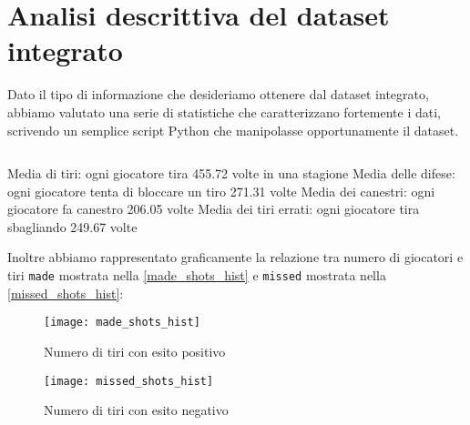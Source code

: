 \section{Analisi descrittiva del dataset integrato}

Dato il tipo di informazione che desideriamo ottenere dal dataset integrato, abbiamo valutato una serie di statistiche che caratterizzano fortemente i dati, scrivendo un semplice script Python che manipolasse opportunamente il dataset.

\begin{code}
\inputminted[breaklines]{python}{../dataintegration/count.py}
\end{code}

Media di tiri: ogni giocatore tira 455.72 volte in una stagione
Media delle difese: ogni giocatore tenta di bloccare un tiro 271.31 volte
Media dei canestri: ogni giocatore fa canestro 206.05 volte
Media dei tiri errati: ogni giocatore tira sbagliando 249.67 volte

Inoltre abbiamo rappresentato graficamente la relazione tra numero di giocatori e tiri \texttt{made} mostrata nella \autoref{made_shots_hist} e \texttt{missed} mostrata nella \autoref{missed_shots_hist}:

\begin{figure}
\caption{Numero di tiri con esito positivo}
\label{made_shots_hist}
\texttt{[image: made\_shots\_hist]}
\end{figure}

\begin{figure}
\caption{Numero di tiri con esito negativo}
\label{missed_shots_hist}
\texttt{[image: missed\_shots\_hist]}
\end{figure}
